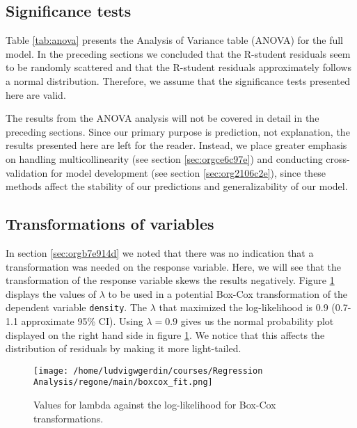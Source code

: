\documentclass[11pt]{article}
\begin{document}
\subsection{Significance tests}
\label{sec:org3948fa3}

Table \ref{tab:anova} presents the Analysis of Variance table (ANOVA) for the full model. In the 
preceding sections we concluded that the R-student residuals seem to be randomly scattered and 
that the R-student residuals approximately follows a normal distribution. Therefore, we assume 
that the significance tests presented here are valid. 

The results from the ANOVA analysis will not be covered in detail in the preceding sections. Since
our primary purpose is prediction, not explanation, the results presented here are left for the 
reader. Instead, we place greater emphasis on handling multicollinearity 
(see section \ref{sec:orgce6c97e}) and conducting
cross-validation for model development (see section \ref{sec:org2106c2e}),
since these methods affect the stability of our predictions and generalizability of our model.



\subsection{Transformations of variables}
\label{sec:orga57053c}

In section \ref{sec:orgb7e914d} we noted that there was no indication that a transformation was needed on the 
response variable. Here, we will see that the transformation of the response variable skews the results negatively.
Figure \ref{fig:orgf335f7f} displays the values of \(\lambda\) to be used in a potential Box-Cox transformation of 
the dependent variable \texttt{density}. The \(\lambda\) that maximized the log-likelihood is 0.9 
(0.7-1.1 approximate 95\% CI). Using \(\lambda = 0.9\) gives us the normal probability plot displayed on the 
right hand side in figure \ref{fig:orgf335f7f}. We notice that this affects the distribution of residuals by
making it more light-tailed. 

\begin{figure}[H]
\centering
\texttt{[image: /home/ludvigwgerdin/courses/Regression Analysis/regone/main/boxcox\_fit.png]}
\caption{\label{fig:orgf335f7f}
Values for lambda against the log-likelihood for Box-Cox transformations.}
\end{figure}
\end{document}
